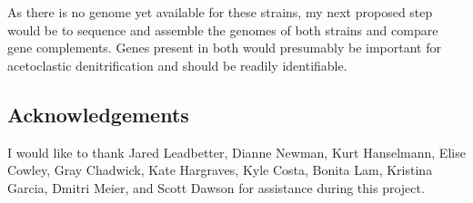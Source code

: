 \documentclass{article}
\begin{document}
As there is no genome yet available for these strains, my next
proposed step would be to sequence and assemble the genomes of both
strains and compare gene complements.  Genes present in both would
presumably be important for acetoclastic denitrification and should
be readily identifiable.

\subsection*{Acknowledgements}

I would like to thank Jared Leadbetter, Dianne Newman, Kurt Hanselmann,
Elise Cowley, Gray Chadwick, Kate Hargraves, Kyle Costa, Bonita Lam,
Kristina Garcia, Dmitri Meier, and Scott Dawson for assistance during
this project.



\end{document}
